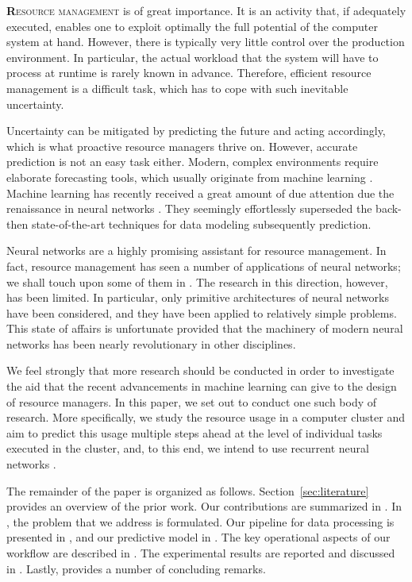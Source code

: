 \lettrine[findent=0.2em, nindent=0em]{\textbf{R}}{esource management} is of
great importance. It is an activity that, if adequately executed, enables one to
exploit optimally the full potential of the computer system at hand. However,
there is typically very little control over the production environment. In
particular, the actual workload that the system will have to process at runtime
is rarely known in advance. Therefore, efficient resource management is a
difficult task, which has to cope with such inevitable uncertainty.

Uncertainty can be mitigated by predicting the future and acting accordingly,
which is what proactive resource managers thrive on. However, accurate
prediction is not an easy task either. Modern, complex environments require
elaborate forecasting tools, which usually originate from machine learning
\cite{hastie2009}. Machine learning has recently received a great amount of due
attention due the renaissance in neural networks \cite{goodfellow2016}. They
seemingly effortlessly superseded the back-then state-of-the-art techniques for
data modeling subsequently prediction.

Neural networks are a highly promising assistant for resource management. In
fact, resource management has seen a number of applications of neural networks;
we shall touch upon some of them in . The research in this
direction, however, has been limited. In particular, only primitive
architectures of neural networks have been considered, and they have been
applied to relatively simple problems. This state of affairs is unfortunate
provided that the machinery of modern neural networks has been nearly
revolutionary in other disciplines.

We feel strongly that more research should be conducted in order to investigate
the aid that the recent advancements in machine learning can give to the design
of resource managers. In this paper, we set out to conduct one such body of
research. More specifically, we study the resource usage in a computer cluster
and aim to predict this usage multiple steps ahead at the level of individual
tasks executed in the cluster, and, to this end, we intend to use recurrent
neural networks \cite{goodfellow2016}.

The remainder of the paper is organized as follows. Section~\ref{sec:literature}
provides an overview of the prior work. Our contributions are summarized in
. In , the problem that we address is
formulated. Our pipeline for data processing is presented in , and
our predictive model in . The key operational aspects of our
workflow are described in . The experimental results are
reported and discussed in . Lastly,  provides a
number of concluding remarks.
